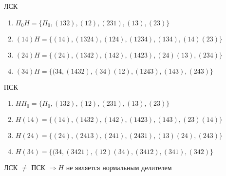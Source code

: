 \documentclass[a4paper, 12pt]{article}
\begin{document}
\begin{center}
    ЛСК
    \begin{enumerate}
        \item $ \Pi_0H = \{\Pi_0 , (132), (12), (231), (13), (23) \}$
        \item $(14)H = \{(14), (1324), (124), (1234), (134), (14)(23)\}$
        \item $(24)H = \{ (24), (1342), (142), (1423), (24)(13), (234)\}$
        \item $(34)H = \{(34, (1432), (34)(12), (1243), (143), (243)\}$
    \end{enumerate}
\end{center}

\begin{center}
    ПСК
    \begin{enumerate}
        \item $ H\Pi_0 = \{\Pi_0 , (132), (12), (231), (13), (23) \}$
        \item $H(14) = \{(14), (1432), (142), (1423), (143), (23)(14)\}$
        \item $H(24) = \{ (24), (2413), (241), (2431), (13)(24), (243)\}$
        \item $H(34) = \{(34, (3421), (12)(34), (3412), (341), (342)\}$
    \end{enumerate}
\end{center}
ЛСК $ \neq $ ПСК $\Longrightarrow H$ не является нормальным делителем 
\end{document}
